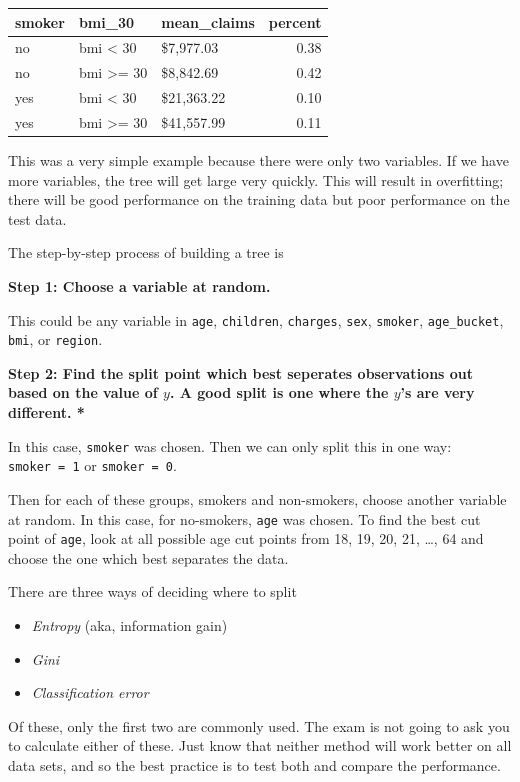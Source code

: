 \documentclass[openany]{book}
\providecommand{\tightlist}{%
  \setlength{\itemsep}{0pt}\setlength{\parskip}{0pt}}
\begin{document}
\begin{longtable}[]{@{}lllr@{}}
\toprule
smoker & bmi\_30 & mean\_claims & percent\tabularnewline
\midrule
\endhead
no & bmi \textless{} 30 & \$7,977.03 & 0.38\tabularnewline
no & bmi \textgreater= 30 & \$8,842.69 & 0.42\tabularnewline
yes & bmi \textless{} 30 & \$21,363.22 & 0.10\tabularnewline
yes & bmi \textgreater= 30 & \$41,557.99 & 0.11\tabularnewline
\bottomrule
\end{longtable}

This was a very simple example because there were only two variables. If we have more variables, the tree will get large very quickly. This will result in overfitting; there will be good performance on the training data but poor performance on the test data.

The step-by-step process of building a tree is

\textbf{Step 1: Choose a variable at random.}

This could be any variable in \texttt{age}, \texttt{children}, \texttt{charges}, \texttt{sex}, \texttt{smoker}, \texttt{age\_bucket}, \texttt{bmi}, or \texttt{region}.

\textbf{Step 2: Find the split point which best seperates observations out based on the value of \(y\). A good split is one where the \(y\)'s are very different. * }

In this case, \texttt{smoker} was chosen. Then we can only split this in one way: \texttt{smoker\ =\ 1} or \texttt{smoker\ =\ 0}.

Then for each of these groups, smokers and non-smokers, choose another variable at random. In this case, for no-smokers, \texttt{age} was chosen. To find the best cut point of \texttt{age}, look at all possible age cut points from 18, 19, 20, 21, \ldots, 64 and choose the one which best separates the data.

There are three ways of deciding where to split

\begin{itemize}
\tightlist
\item
  \emph{Entropy} (aka, information gain)
\item
  \emph{Gini}
\item
  \emph{Classification error}
\end{itemize}

Of these, only the first two are commonly used. The exam is not going to ask you to calculate either of these. Just know that neither method will work better on all data sets, and so the best practice is to test both and compare the performance.
\end{document}
